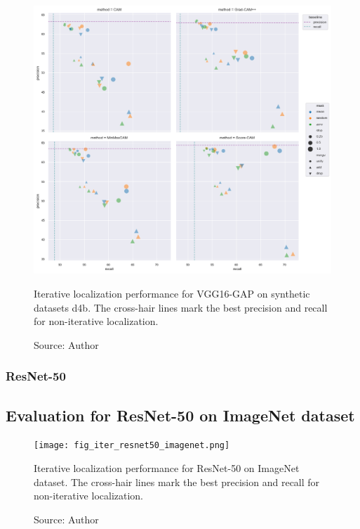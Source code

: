 \begin{figure}[ht]
    \begin{center}       
    \includegraphics[width=1.0\textwidth]{images/fig_iter_vgg16_gap_syn_d4b.png}
    \caption[Iterative localization performance for VGG16-GAP on synthetic dataset d4b]{Iterative localization performance for VGG16-GAP on synthetic datasets d4b. The cross-hair lines mark the best precision and recall for non-iterative localization.}
    \caption*{Source: Author}
    \label{fig:prec_iter_vgg16_gap_syn_d4b}
    \end{center}
\end{figure}

\subsubsection{ResNet-50}

\subsection{Evaluation for ResNet-50 on ImageNet dataset}

\begin{figure}[ht]
    \begin{center}       
    \texttt{[image: fig\_iter\_resnet50\_imagenet.png]}
    \caption[Iterative localization performance for ResNet-50 on ImageNet dataset]{Iterative localization performance for ResNet-50 on ImageNet dataset. The cross-hair lines mark the best precision and recall for non-iterative localization.}
    \caption*{Source: Author}
    \label{fig:prec_iter_resnet50_imagenet}
    \end{center}
\end{figure}
